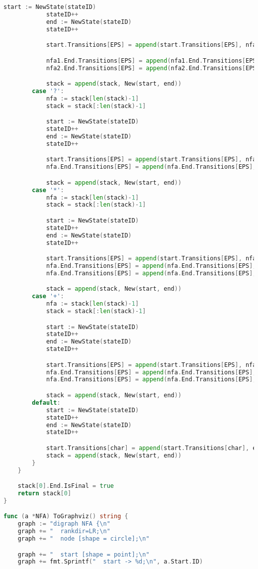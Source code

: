 \begin{lstlisting}[language=Go, caption={Код модуля \textit{nfa}}]
			start := NewState(stateID)
			stateID++
			end := NewState(stateID)
			stateID++

			start.Transitions[EPS] = append(start.Transitions[EPS], nfa1.Start, nfa2.Start)

			nfa1.End.Transitions[EPS] = append(nfa1.End.Transitions[EPS], end)
			nfa2.End.Transitions[EPS] = append(nfa2.End.Transitions[EPS], end)

			stack = append(stack, New(start, end))
		case '?':
			nfa := stack[len(stack)-1]
			stack = stack[:len(stack)-1]

			start := NewState(stateID)
			stateID++
			end := NewState(stateID)
			stateID++

			start.Transitions[EPS] = append(start.Transitions[EPS], nfa.Start, end)
			nfa.End.Transitions[EPS] = append(nfa.End.Transitions[EPS], end)

			stack = append(stack, New(start, end))
		case '*':
			nfa := stack[len(stack)-1]
			stack = stack[:len(stack)-1]

			start := NewState(stateID)
			stateID++
			end := NewState(stateID)
			stateID++

			start.Transitions[EPS] = append(start.Transitions[EPS], nfa.Start, end)
			nfa.End.Transitions[EPS] = append(nfa.End.Transitions[EPS], nfa.Start)
			nfa.End.Transitions[EPS] = append(nfa.End.Transitions[EPS], end)

			stack = append(stack, New(start, end))
		case '+':
			nfa := stack[len(stack)-1]
			stack = stack[:len(stack)-1]

			start := NewState(stateID)
			stateID++
			end := NewState(stateID)
			stateID++

			start.Transitions[EPS] = append(start.Transitions[EPS], nfa.Start)
			nfa.End.Transitions[EPS] = append(nfa.End.Transitions[EPS], nfa.Start)
			nfa.End.Transitions[EPS] = append(nfa.End.Transitions[EPS], end)

			stack = append(stack, New(start, end))
		default:
			start := NewState(stateID)
			stateID++
			end := NewState(stateID)
			stateID++

			start.Transitions[char] = append(start.Transitions[char], end)
			stack = append(stack, New(start, end))
		}
	}

	stack[0].End.IsFinal = true
	return stack[0]
}

func (a *NFA) ToGraphviz() string {
	graph := "digraph NFA {\n"
	graph += "  rankdir=LR;\n"
	graph += "  node [shape = circle];\n"

	graph += "  start [shape = point];\n"
	graph += fmt.Sprintf("  start -> %d;\n", a.Start.ID)


\end{lstlisting}

